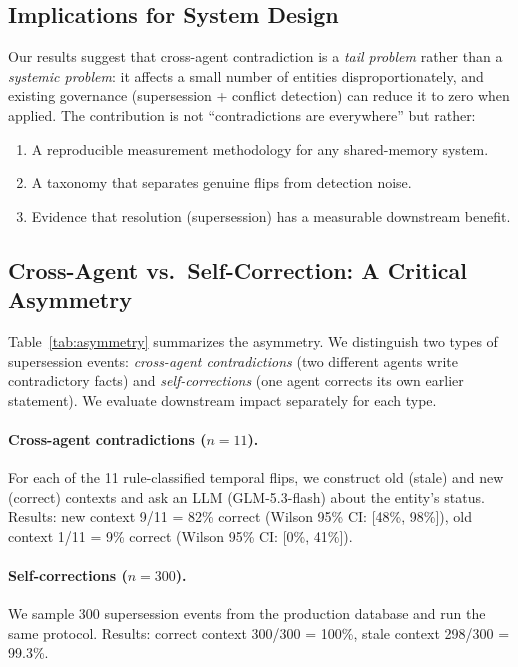 \documentclass{article}
\begin{document}
\subsection{Implications for System Design}
Our results suggest that cross-agent contradiction is a \emph{tail problem} rather than a \emph{systemic problem}: it affects a small number of entities disproportionately, and existing governance (supersession + conflict detection) can reduce it to zero when applied. The contribution is not ``contradictions are everywhere'' but rather:

\begin{enumerate}
\item A reproducible measurement methodology for any shared-memory system.
\item A taxonomy that separates genuine flips from detection noise.
\item Evidence that resolution (supersession) has a measurable downstream benefit.
\end{enumerate}



\subsection{Cross-Agent vs.\ Self-Correction: A Critical Asymmetry}

Table~\ref{tab:asymmetry} summarizes the asymmetry. 
We distinguish two types of supersession events: \emph{cross-agent contradictions} (two different agents write contradictory facts) and \emph{self-corrections} (one agent corrects its own earlier statement). We evaluate downstream impact separately for each type.

\paragraph{Cross-agent contradictions ($n{=}11$).} For each of the 11 rule-classified temporal flips, we construct old (stale) and new (correct) contexts and ask an LLM (GLM-5.3-flash) about the entity's status. Results: new context 9/11 = 82\% correct (Wilson 95\% CI: [48\%, 98\%]), old context 1/11 = 9\% correct (Wilson 95\% CI: [0\%, 41\%]).

\paragraph{Self-corrections ($n{=}300$).} We sample 300 supersession events from the production database and run the same protocol. Results: correct context 300/300 = 100\%, stale context 298/300 = 99.3\%.
\end{document}
